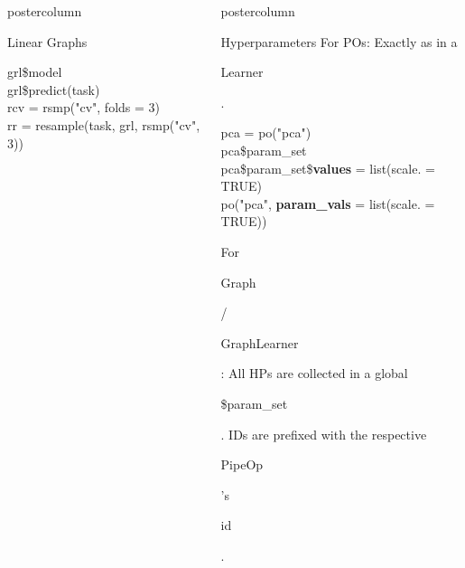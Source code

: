 \documentclass{beamer}
\newlength{\columnheight} %
\newcommand{\codeinline}[1]{\begin{codeboxinline}#1\end{codeboxinline}}
\begin{document}
\begin{frame}[fragile]{}
\begin{columns}
\begin{column}{.245\textwidth}
\begin{beamercolorbox}[center]{postercolumn}
\begin{minipage}{.98\textwidth}
{\begin{myblock}{Linear Graphs}
\begin{codeboxexample}
{                  grl\$model\\
                  grl\$predict(task)\\
                  rcv = rsmp("cv", folds = 3)\\
                  rr = resample(task, grl, rsmp("cv", 3))
              }
              \end{codeboxexample}
            \end{myblock}
						\vfill}
				\end{minipage}
			\end{beamercolorbox}
		\end{column}
		\begin{column}{.245\textwidth}
			\begin{beamercolorbox}[center]{postercolumn}
				\begin{minipage}{.98\textwidth}
					\parbox[t][\columnheight]{\textwidth}{
            \begin{myblock}{Hyperparameters}
              \vspace{-0.5em}
              For POs: Exactly as in a \codeinline{Learner}.
              \begin{codeboxmultiline}[width=24cm]
                {\footnotesize pca = po("pca") \\
                pca\$param\_set\\
                pca\$param\_set\$\textbf{values} = list(scale. = TRUE) \\
                po("pca", \textbf{param\_vals} = list(scale. = TRUE))}
              \end{codeboxmultiline}
              For \codeinline{Graph} / \codeinline{GraphLearner}: All HPs are collected in a global \codeinline{\$param\_set}. IDs are prefixed with the respective \codeinline{PipeOp}'s \codeinline{id}.

\end{myblock}}
\end{minipage}
\end{beamercolorbox}
\end{column}
\end{columns}
\end{frame}
\end{document}
